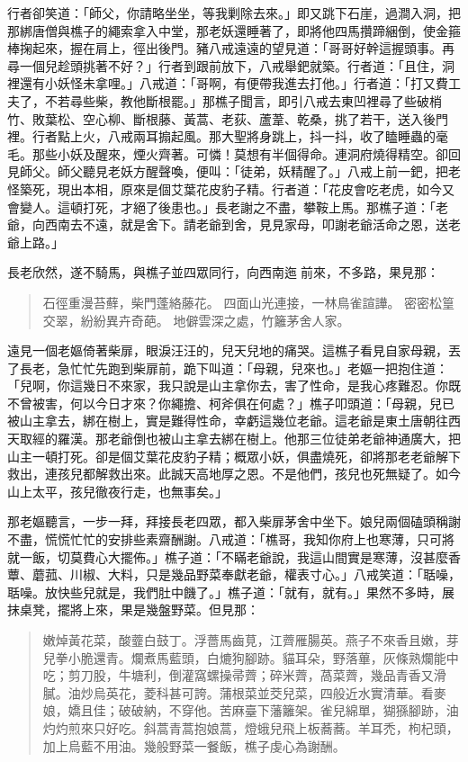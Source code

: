行者卻笑道：「師父，你請略坐坐，等我剿除去來。」即又跳下石崖，過澗入洞，把那綁唐僧與樵子的繩索拿入中堂，那老妖還睡著了，即將他四馬攢蹄綑倒，使金箍棒掬起來，握在肩上，徑出後門。豬八戒遠遠的望見道：「哥哥好幹這握頭事。再尋一個兒趁頭挑著不好？」行者到跟前放下，八戒舉鈀就築。行者道：「且住，洞裡還有小妖怪未拿哩。」八戒道：「哥啊，有便帶我進去打他。」行者道：「打又費工夫了，不若尋些柴，教他斷根罷。」那樵子聞言，即引八戒去東凹裡尋了些破梢竹、敗葉松、空心柳、斷根藤、黃蒿、老荻、蘆葦、乾桑，挑了若干，送入後門裡。行者點上火，八戒兩耳搧起風。那大聖將身跳上，抖一抖，收了瞌睡蟲的毫毛。那些小妖及醒來，煙火齊著。可憐！莫想有半個得命。連洞府燒得精空。卻回見師父。師父聽見老妖方醒聲喚，便叫：「徒弟，妖精醒了。」八戒上前一鈀，把老怪築死，現出本相，原來是個艾葉花皮豹子精。行者道：「花皮會吃老虎，如今又會變人。這頓打死，才絕了後患也。」長老謝之不盡，攀鞍上馬。那樵子道：「老爺，向西南去不遠，就是舍下。請老爺到舍，見見家母，叩謝老爺活命之恩，送老爺上路。」

長老欣然，遂不騎馬，與樵子並四眾同行，向西南迤𨓦前來，不多路，果見那：
\begin{quote}
石徑重漫苔蘚，柴門蓬絡藤花。
四面山光連接，一林鳥雀諠譁。
密密松篁交翠，紛紛異卉奇葩。
地僻雲深之處，竹籬茅舍人家。
\end{quote}

遠見一個老嫗倚著柴扉，眼淚汪汪的，兒天兒地的痛哭。這樵子看見自家母親，丟了長老，急忙忙先跑到柴扉前，跪下叫道：「母親，兒來也。」老嫗一把抱住道：「兒啊，你這幾日不來家，我只說是山主拿你去，害了性命，是我心疼難忍。你既不曾被害，何以今日才來？你繩擔、柯斧俱在何處？」樵子叩頭道：「母親，兒已被山主拿去，綁在樹上，實是難得性命，幸虧這幾位老爺。這老爺是東土唐朝往西天取經的羅漢。那老爺倒也被山主拿去綁在樹上。他那三位徒弟老爺神通廣大，把山主一頓打死。卻是個艾葉花皮豹子精；概眾小妖，俱盡燒死，卻將那老老爺解下救出，連孩兒都解救出來。此誠天高地厚之恩。不是他們，孩兒也死無疑了。如今山上太平，孩兒徹夜行走，也無事矣。」

那老嫗聽言，一步一拜，拜接長老四眾，都入柴扉茅舍中坐下。娘兒兩個磕頭稱謝不盡，慌慌忙忙的安排些素齋酬謝。八戒道：「樵哥，我知你府上也寒薄，只可將就一飯，切莫費心大擺佈。」樵子道：「不瞞老爺說，我這山間實是寒薄，沒甚麼香蕈、蘑菰、川椒、大料，只是幾品野菜奉獻老爺，權表寸心。」八戒笑道：「聒噪，聒噪。放快些兒就是，我們肚中饑了。」樵子道：「就有，就有。」果然不多時，展抹桌凳，擺將上來，果是幾盤野菜。但見那：
\begin{quote}
嫩焯黃花菜，酸虀白鼓丁。浮薔馬齒莧，江薺雁腸英。燕子不來香且嫩，芽兒拳小脆還青。爛煮馬藍頭，白熝狗腳跡。貓耳朵，野落蓽，灰條熟爛能中吃；剪刀股，牛塘利，倒灌窩螺操帚薺；碎米薺，萵菜薺，幾品青香又滑膩。油炒烏英花，菱科甚可誇。蒲根菜並茭兒菜，四般近水實清華。看麥娘，嬌且佳；破破納，不穿他。苦麻臺下藩籬架。雀兒綿單，猢猻腳跡，油灼灼煎來只好吃。斜蒿青蒿抱娘蒿，燈蛾兒飛上板蕎蕎。羊耳禿，枸杞頭，加上烏藍不用油。幾般野菜一餐飯，樵子虔心為謝酬。
\end{quote}

